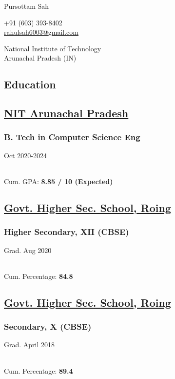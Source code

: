 \documentclass[]{article}
\newcommand{\namesection}[3]{
  \begin{multicols}{2}
    \begin{flushleft}
      \fontsize{30pt}{25pt}
      \fontspec[Path = fonts/ZillaSlab/]{ZillaSlab-Light}
      {{ #1 } {#2 }}
      \columnbreak\\
    \end{flushleft}
    \begin{flushright}
      { #3 }
    \end{flushright}
  \end{multicols}
  \vspace{-10pt}
}
\newcommand{\subheading}[2]{
  {\subsubsection*{#1}
  \hfill #2} 
}
\begin{document}
\namesection{Pursottam}{Sah}{
  +91 (603) 393-8402\\
  \href{mailto:rahulsah6003@gmail.com}{rahulsah6003@gmail.com}\par
  National Institute of Technology\\
  Arunachal Pradesh (IN)
}


\begin{multicols}{2}
  \begin{flushleft}

    \section*{Education}
    \subsection*{\href{http://nitap.ac.in/}{NIT Arunachal Pradesh}}
    \subheading{B. Tech in Computer Science Eng}{Oct 2020-2024} \\
    {Cum. GPA: \textbf{8.85 / 10 (Expected)}} 

    \subsection*{\href{https://roing.nic.in/public-utility/govt-hr-secondary-school-roing/}{Govt. Higher Sec. School, Roing}}
    \subheading{Higher Secondary, XII (CBSE)}{Grad. Aug 2020} \\
    {Cum. Percentage: \textbf{84.8}} 

    \subsection*{\href{https://roing.nic.in/public-utility/govt-hr-secondary-school-roing/}{Govt. Higher Sec. School, Roing}} 
    \subheading{Secondary, X (CBSE)}{Grad. April 2018} \\
    {Cum. Percentage: \textbf{89.4}} \\


\end{flushleft}
\end{multicols}
\end{document}
